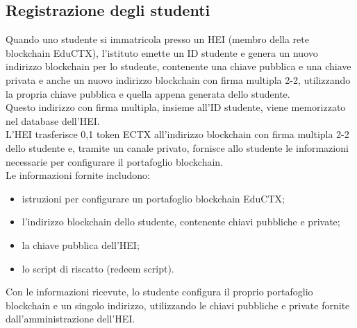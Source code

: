 \subsection{Registrazione degli studenti}
Quando uno studente si immatricola presso un HEI (membro della rete blockchain EduCTX), l'istituto emette un ID studente e genera un nuovo indirizzo blockchain per lo studente, contenente una chiave pubblica e una chiave privata
e anche un nuovo indirizzo blockchain con firma multipla 2-2, utilizzando la propria chiave pubblica e quella appena generata dello studente. 
\\Questo indirizzo con firma multipla, insieme all'ID studente, viene memorizzato nel database dell'HEI.
\\L'HEI trasferisce 0,1 token ECTX all'indirizzo blockchain con firma multipla 2-2 dello studente e, tramite un canale privato, fornisce allo studente le informazioni necessarie per configurare il portafoglio blockchain. 
\\Le informazioni fornite includono:
\begin{itemize}
    \item istruzioni per configurare un portafoglio blockchain EduCTX;
    \item l'indirizzo blockchain dello studente, contenente chiavi pubbliche e private;
    \item la chiave pubblica dell'HEI;
    \item lo script di riscatto (redeem script).
\end{itemize}
Con le informazioni ricevute, lo studente configura il proprio portafoglio blockchain e un singolo indirizzo, utilizzando le chiavi pubbliche e private fornite dall'amministrazione dell'HEI.

